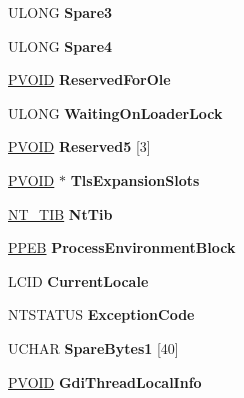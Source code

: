 \begin{DoxyCompactItemize}
U\+L\+O\+NG {\bfseries Spare3}
\item 
\mbox{\label{struct___t_e_b_a8d2fd0aaa96bff2c44e672ce9614ff71}} 
U\+L\+O\+NG {\bfseries Spare4}
\item 
\mbox{\label{struct___t_e_b_acc4b3694861c780a51bd6e5ead72b4fe}} 
\hyperlink{interfacevoid}{P\+V\+O\+ID} {\bfseries Reserved\+For\+Ole}
\item 
\mbox{\label{struct___t_e_b_a2f8ee96703c27f3162928d5c97444eaf}} 
U\+L\+O\+NG {\bfseries Waiting\+On\+Loader\+Lock}
\item 
\mbox{\label{struct___t_e_b_a073f6f06c903f5bfde0debd8e88f00be}} 
\hyperlink{interfacevoid}{P\+V\+O\+ID} {\bfseries Reserved5} \mbox{[}3\mbox{]}
\item 
\mbox{\label{struct___t_e_b_a62a9a424317fb50d5555ccaa67008d8c}} 
\hyperlink{interfacevoid}{P\+V\+O\+ID} $\ast$ {\bfseries Tls\+Expansion\+Slots}
\item 
\mbox{\label{struct___t_e_b_a7df5a7fad8f278550a147892b7d18cdd}} 
\hyperlink{struct___n_t___t_i_b}{N\+T\+\_\+\+T\+IB} {\bfseries Nt\+Tib}
\item 
\mbox{\label{struct___t_e_b_ad05c218245caae4e0e98669d42b74e73}} 
\hyperlink{struct___p_e_b}{P\+P\+EB} {\bfseries Process\+Environment\+Block}
\item 
\mbox{\label{struct___t_e_b_af21d897dc3bd9f3f7d4b8baeec51177d}} 
L\+C\+ID {\bfseries Current\+Locale}
\item 
\mbox{\label{struct___t_e_b_ab5ef6c79ba3eb5cca08d59de842b23b9}} 
N\+T\+S\+T\+A\+T\+US {\bfseries Exception\+Code}
\item 
\mbox{\label{struct___t_e_b_aa44541eeaa1dff6e295e853041eee6f4}} 
U\+C\+H\+AR {\bfseries Spare\+Bytes1} \mbox{[}40\mbox{]}
\item 
\mbox{\label{struct___t_e_b_a1e24c5743f5268143c8776c10612295e}} 
\hyperlink{interfacevoid}{P\+V\+O\+ID} {\bfseries Gdi\+Thread\+Local\+Info}

\end{DoxyCompactItemize}
